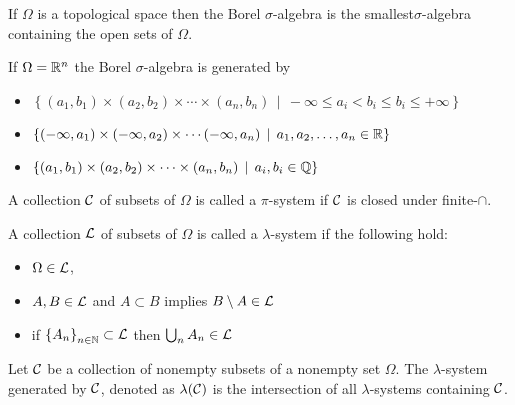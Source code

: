\begin{definition}
    If $\Omega$ is a topological space then the Borel $\sigma$-algebra is the smallest$\sigma$-algebra containing the open sets of $\Omega$.
    \label{def:borel-sigma-algebra}
\end{definition}

\begin{fact}
    If $\Omega = \mathbb R ^n$ the Borel $\sigma$-algebra is generated by
    \begin{itemize}
	\item $\left\{ \left( a_1 , b_1 \right) \times \left( a_2 , b_2 \right) \times\cdots \times \left( a_n , b_n \right) \, \mid \, -\infty \le a_i < b_i \le b_i \le +\infty  \right\} $
	\item $\left\{ \left( -\infty , a_1 \right) \times \left( -\infty , a_2 \right) \times \cdots \left( -\infty , a_n \right) \, \mid \, a_1 ,a_2, \ldots , a_n \in \mathbb R \right\}$
	\item $\left\{ \left( a_1 , b_1 \right)\times \left( a_2 , b_2 \right) \times \cdots \times \left( a_n , b_n \right) \, \mid \, a_i , b_i \in \mathbb Q \right\}$
    \end{itemize}
\end{fact}

\begin{definition}
    A collection ${\cal C}$ of subsets of $\Omega$ is called a $\pi$-system if ${\cal C}$ is closed under finite-$\cap$.

    A collection ${\cal L}$ of subsets of $\Omega$ is called a $\lambda$-system if the following hold:
    \begin{itemize}
	\item $\Omega \in {\cal L}$,
	\item $A,B\in {\cal L}$ and $A\subset B$ implies $B\setminus A \in {\cal L}$
	\item if $\left\{ A_n \right\}_{n\in\mathbb N} \subset {\cal L}$ then $\bigcup_{n} A_n \in {\cal L}$
    \end{itemize}
    \label{def:pi-lambda}
\end{definition}

\begin{definition}
    Let ${\cal C}$ be a collection of nonempty subsets of a nonempty set $\Omega$. The $\lambda$-system generated by ${\cal C}$, denoted as $\lambda ({\cal C} )$ is the intersection of all $\lambda$-systems containing ${\cal C}$.
    \label{def:generated-lambda-system}
\end{definition}

